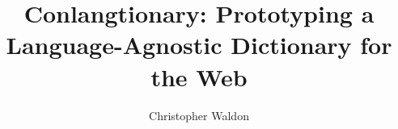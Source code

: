 \documentclass[11pt]{asu}
\title{Conlangtionary: Prototyping a Language-Agnostic Dictionary for the Web}
\author{Christopher Waldon}
\begin{document}
	\begin{preliminary}
		\maketitle
        \makecopyright
        
		\tableofcontents
        \listoftables
        \listoffigures
	\end{preliminary}


		\begin{doublespace}
	    
	    
	    
        
        
        
		\end{doublespace}

	\newpage
    
	
    \nocite{*}
    \begin{appendices}
      \begin{singlespace}
        
      \end{singlespace}    
    \end{appendices}
\end{document}
